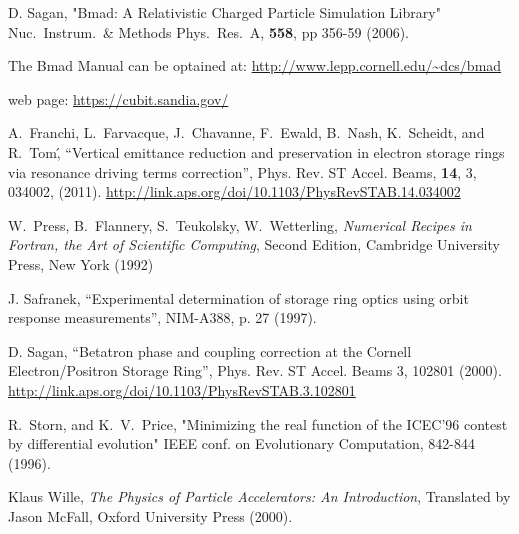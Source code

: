 \begin{thebibliography}{99}

D. Sagan,
"Bmad: A Relativistic Charged Particle Simulation Library"
Nuc.\ Instrum.\ \& Methods Phys.\ Res.\ A, {\bf 558}, pp 356-59 (2006).

The Bmad Manual can be optained at:
\hfill\break
\hspace*{20pt} 
\url{http://www.lepp.cornell.edu/~dcs/bmad}

 web page:
\hfill\break
\hspace*{20pt} 
\url{https://cubit.sandia.gov/}

A.~Franchi, L.~Farvacque, J.~Chavanne, F.~Ewald, B.~Nash, K.~Scheidt, and R.~Tom\',
``Vertical emittance reduction and preservation in electron storage rings via resonance driving terms correction'',
Phys. Rev. ST Accel. Beams,
{\bf 14}, 3, 034002, (2011). 
\hfill\break
\hspace*{20pt}
\url{http://link.aps.org/doi/10.1103/PhysRevSTAB.14.034002}

W.~Press, B.~Flannery, S.~Teukolsky, W.~Wetterling,
{\em Numerical Recipes in Fortran, the Art of Scientific Computing},
Second Edition, Cambridge University Press, New York (1992)

J. Safranek, ``Experimental determination of storage ring optics
using orbit response measurements'', NIM-A388, p. 27 (1997).

D. Sagan,
``Betatron phase and coupling correction at the Cornell Electron/Positron
Storage Ring'', Phys. Rev. ST Accel. Beams 3, 102801 (2000).
\hfill\break
\hspace*{20pt}
\url{http://link.aps.org/doi/10.1103/PhysRevSTAB.3.102801}

R.~Storn, and K.~V.~Price, "Minimizing the real function of the
ICEC'96 contest by differential evolution" IEEE conf. on Evolutionary
Computation, 842-844 (1996).

Klaus Wille, {\em The Physics of Particle Accelerators: An Introduction},
Translated by Jason McFall, Oxford University Press (2000).

\end{thebibliography}
